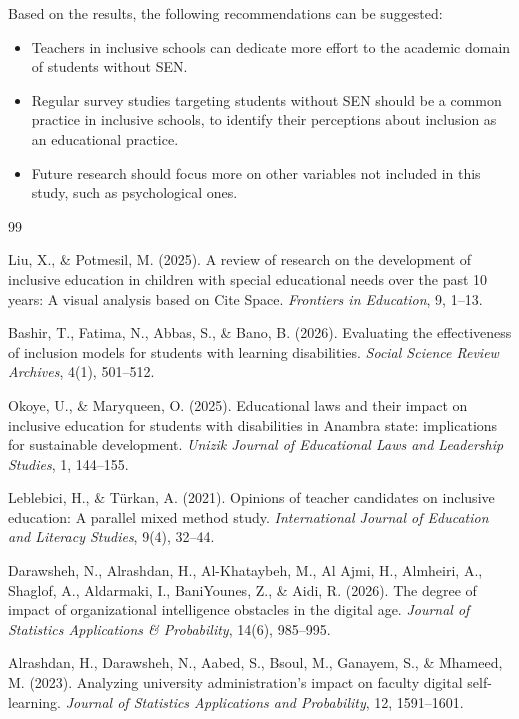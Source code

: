 \documentclass[10pt]{NSP1}
\begin{document}
	Based on the results, the following recommendations can be suggested:

	\begin{itemize}
		\item Teachers in inclusive schools can dedicate more effort to the academic domain of students without SEN.
		\item Regular survey studies targeting students without SEN should be a common practice in inclusive schools, to identify their perceptions about inclusion as an educational practice.
		\item Future research should focus more on other variables not included in this study, such as psychological ones.
	\end{itemize}

	\begin{thebibliography}{99}

		Liu, X., \& Potmesil, M. (2025). A review of research on the development of inclusive education in children with special educational needs over the past 10 years: A visual analysis based on Cite Space. \textit{Frontiers in Education}, 9, 1--13.

		Bashir, T., Fatima, N., Abbas, S., \& Bano, B. (2026). Evaluating the effectiveness of inclusion models for students with learning disabilities. \textit{Social Science Review Archives}, 4(1), 501--512.

		Okoye, U., \& Maryqueen, O. (2025). Educational laws and their impact on inclusive education for students with disabilities in Anambra state: implications for sustainable development. \textit{Unizik Journal of Educational Laws and Leadership Studies}, 1, 144--155.

		Leblebici, H., \& T\"{u}rkan, A. (2021). Opinions of teacher candidates on inclusive education: A parallel mixed method study. \textit{International Journal of Education and Literacy Studies}, 9(4), 32--44.

		Darawsheh, N., Alrashdan, H., Al-Khataybeh, M., Al Ajmi, H., Almheiri, A., Shaglof, A., Aldarmaki, I., BaniYounes, Z., \& Aidi, R. (2026). The degree of impact of organizational intelligence obstacles in the digital age. \textit{Journal of Statistics Applications \& Probability}, 14(6), 985--995.

		Alrashdan, H., Darawsheh, N., Aabed, S., Bsoul, M., Ganayem, S., \& Mhameed, M. (2023). Analyzing university administration's impact on faculty digital self-learning. \textit{Journal of Statistics Applications and Probability}, 12, 1591--1601.


\end{thebibliography}
\end{document}
